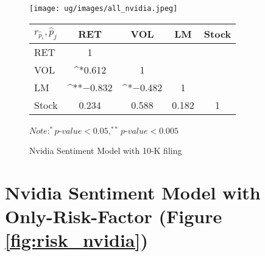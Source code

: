 \documentclass[logo,bsc,singlespacing,parskip]{infthesis}
\begin{document}
\begin{figure}[p]
\centering
\begin{minipage}{0.90\textwidth}
    \centering
    \texttt{[image: ug/images/all\_nvidia.jpeg]}
    \caption{Nvidia Sentiment Model with 10-K filing}
    \label{fig:all_nvidia}
\end{minipage}%
\hfill
\vspace{30pt} %
\begin{minipage}{0.9\textwidth}

    \begin{minipage}[p]{0.9\textwidth}
    \centering
    \begin{tabular}{lcccc}
    \label{tab:all_nvidia_corr}
    $r_\hat{p}_i,\hat{p}_j$      & RET       & VOL       & LM        & Stock    \\ \hline
    RET    & 1  & &  &  \\  
    VOL    & ^{*}0.612   & 1  &  &   \\
    LM    & ^{**}$-$0.832 & ^{*}$-$0.482 & 1  &  \\
    Stock  & 0.234 & 0.588  & 0.182 & 1  \\ \hline
    \end{tabular}
    \medskip
    $\textit{Note}: ^{*}p$-$value<0.05, ^{**}p$-$value<0.005$
    \end{minipage}

\end{minipage}
\end{figure}

\section{Nvidia Sentiment Model with Only-Risk-Factor (Figure \ref{fig:risk_nvidia})}
\label{appendix_corr_risk_nvidia}
\end{document}
